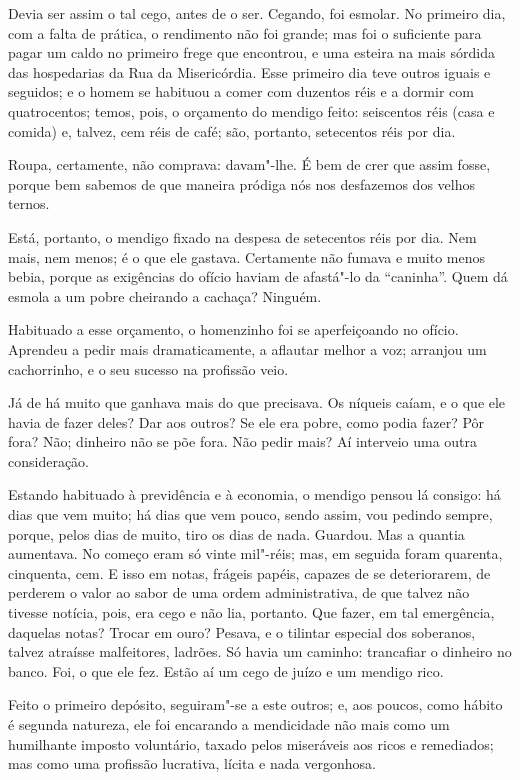 Devia ser assim o tal cego, antes de o ser. Cegando, foi esmolar. No
primeiro dia, com a falta de prática, o rendimento não foi grande; mas
foi o suficiente para pagar um caldo no primeiro frege que encontrou, e
uma esteira na mais sórdida das hospedarias da Rua da Misericórdia. Esse
primeiro dia teve outros iguais e seguidos; e o homem se habituou a
comer com duzentos réis e a dormir com quatrocentos; temos, pois, o
orçamento do mendigo feito: seiscentos réis (casa e comida) e, talvez,
cem réis de café; são, portanto, setecentos réis por dia.

Roupa, certamente, não comprava: davam"-lhe. É bem de crer que assim
fosse, porque bem sabemos de que maneira pródiga nós nos desfazemos dos
velhos ternos.

Está, portanto, o mendigo fixado na despesa de setecentos réis por dia.
Nem mais, nem menos; é o que ele gastava. Certamente não fumava e muito
menos bebia, porque as exigências do ofício haviam de afastá"-lo da
``caninha''. Quem dá esmola a um pobre cheirando a cachaça? Ninguém.

Habituado a esse orçamento, o homenzinho foi se aperfeiçoando no ofício.
Aprendeu a pedir mais dramaticamente, a aflautar melhor a voz; arranjou
um cachorrinho, e o seu sucesso na profissão veio.

Já de há muito que ganhava mais do que precisava. Os níqueis caíam, e o
que ele havia de fazer deles? Dar aos outros? Se ele era pobre, como
podia fazer? Pôr fora? Não; dinheiro não se põe fora. Não pedir mais? Aí
interveio uma outra consideração.

Estando habituado à previdência e à economia, o mendigo pensou lá
consigo: há dias que vem muito; há dias que vem pouco, sendo assim, vou
pedindo sempre, porque, pelos dias de muito, tiro os dias de nada.
Guardou. Mas a quantia aumentava. No começo eram só vinte mil"-réis; mas,
em seguida foram quarenta, cinquenta, cem. E isso em notas, frágeis
papéis, capazes de se deteriorarem, de perderem o valor ao sabor de uma
ordem administrativa, de que talvez não tivesse notícia, pois, era cego
e não lia, portanto. Que fazer, em tal emergência, daquelas notas?
Trocar em ouro? Pesava, e o tilintar especial dos soberanos, talvez
atraísse malfeitores, ladrões. Só havia um caminho: trancafiar o
dinheiro no banco. Foi, o que ele fez. Estão aí um cego de juízo e um
mendigo rico.

Feito o primeiro depósito, seguiram"-se a este outros; e, aos poucos,
como hábito é segunda natureza, ele foi encarando a mendicidade não mais
como um humilhante imposto voluntário, taxado pelos miseráveis aos ricos
e remediados; mas como uma profissão lucrativa, lícita e nada
vergonhosa.

